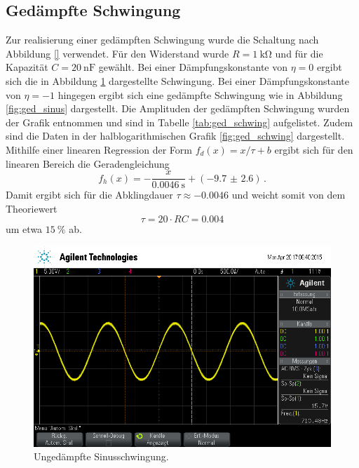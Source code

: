 \subsection{Gedämpfte Schwingung} %
\label{sub:subsection_name}

Zur realisierung einer gedämpften Schwingung wurde die Schaltung nach Abbildung \ref{} verwendet.
Für den Widerstand wurde $R = \SI{1}{\kilo\ohm}$ und für die Kapazität $C = \SI{20}{\nano\farad}$ gewählt.
Bei einer Dämpfungskonstante von $\eta = 0$ ergibt sich die in Abbildung \ref{fig:unged_sinus} dargestellte Schwingung.
Bei einer Dämpfungskonstante von $\eta = -1$ hingegen ergibt sich eine gedämpfte Schwingung wie in Abbildung \ref{fig:ged_sinus} dargestellt.
Die Amplituden der gedämpften Schwingung wurden der Grafik entnommen und sind in Tabelle \ref{tab:ged_schwing} aufgelistet.
Zudem sind die Daten in der halblogarithmischen Grafik \ref{fig:ged_schwing} dargestellt.
Mithilfe einer linearen Regression der Form $f_{d}(x) = x / \tau + b$ ergibt sich für den linearen Bereich die Geradengleichung
\begin{equation*}
    f_h(x) = -\frac{x}{\SI{0.0046}{\second}} + (\num{-9.7(26)})\,.
\end{equation*}
Damit ergibt sich für die Abklingdauer $\tau \approx \num{-0.0046}$ und weicht somit von dem Theoriewert
\begin{equation*}
    \tau = 20 \cdot R C = 0.004
\end{equation*}
um etwa $\SI{15}{\percent}$ ab.

\begin{figure}[!h]
    \centering
    \includegraphics[width=0.8\linewidth]{data/scope_16.png}
    \caption{Ungedämpfte Sinusschwingung.}
    \label{fig:unged_sinus}
\end{figure}

